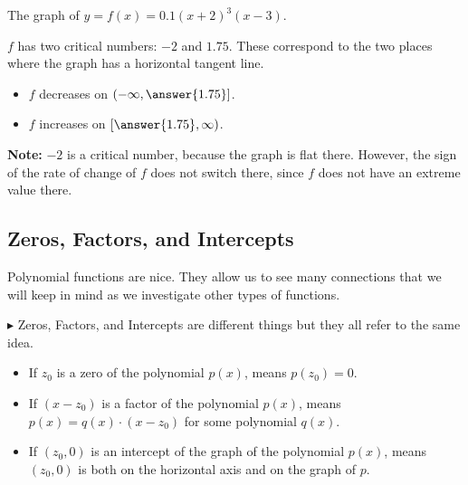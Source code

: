 \documentclass{ximera}
\begin{document}
\begin{example}

The graph of $y = f(x) = 0.1(x+2)^3(x-3)$.



\begin{center}
\end{center}



$f$ has two critical numbers: $-2$ and $1.75$. These correspond to the two places where the graph has a horizontal tangent line.

\begin{itemize}
\item $f$ decreases on $\left(-\infty, \answer{1.75}\right]$.
\item $f$ increases on $\left[\answer{1.75}, \infty\right)$.
\end{itemize}




\end{example}


\textbf{Note:} $-2$ is a critical number, because the graph is flat there.  However, the sign of the rate of change of $f$ does not switch there, since $f$ does not have an extreme value there.










\subsection*{Zeros, Factors, and Intercepts}




Polynomial functions are nice.  They allow us to see many connections that we will keep in mind as we investigate other types of functions.


\textbf{\textcolor{red!90!darkgray}{$\blacktriangleright$}} Zeros, Factors, and Intercepts are different things but they all refer to the same idea.





\begin{itemize}

\item If $z_0$ is a zero of the polynomial $p(x)$, means $p(z_0)=0$.


\item If $(x-z_0)$ is a factor of the polynomial $p(x)$, means $p(x) = q(x) \cdot (x-z_0)$ for some polynomial $q(x)$.


\item If $(z_0,0)$ is an intercept of the graph of the polynomial $p(x)$, means $(z_0,0)$ is both on the horizontal axis and on the graph of $p$.

\end{itemize}
\end{document}
